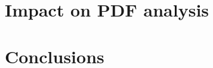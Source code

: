 \documentclass[reprint,aps,unsortedaddress,superscriptaddress,prc,floatfix,showpacs,linenumbers]{revtex4-2}
\begin{document}
\section{Impact on PDF analysis}

\section{Conclusions}
\label{sec:Conclusions}
\begin{acknowledgments}
\end{acknowledgments}

\end{document}
